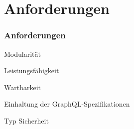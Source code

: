 \section{Anforderungen}

\begin{frame}
    \frametitle{Anforderungen}

    \begin{alertblock}{Modularität}
    \end{alertblock}
    \begin{alertblock}{Leistungsfähigkeit}
    \end{alertblock}
    \begin{alertblock}{Wartbarkeit}
    \end{alertblock}
    \begin{alertblock}{Einhaltung der GraphQL-Spezifikationen}
    \end{alertblock}
    \begin{alertblock}{Typ Sicherheit}
    \end{alertblock}

\end{frame}
